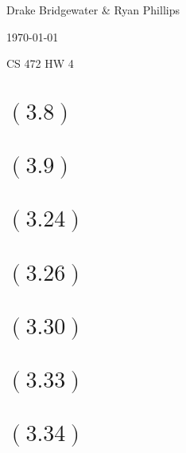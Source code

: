 \documentclass[letterpaper,12pt,titlepage]{article}
\def\name{Drake Bridgewater \& Ryan Phillips}
\begin{document}
\hfill \name

\hfill \today

\hfill CS 472 HW 4

\section*{$(3.8)$} 
\begin{mdframed}[style=MyFrame]
\end{mdframed}

\section*{$(3.9)$} 
\begin{mdframed}[style=MyFrame]
\end{mdframed}

\section*{$(3.24)$}
\begin{mdframed}[style=MyFrame]
\end{mdframed} 

\section*{$(3.26)$}
\begin{mdframed}[style=MyFrame]
\end{mdframed} 

\section*{$(3.30)$} 
\begin{mdframed}[style=MyFrame]
\end{mdframed}

\section*{$(3.33)$} 
\begin{mdframed}[style=MyFrame]
\end{mdframed}

\section*{$(3.34)$}
\begin{mdframed}[style=MyFrame]
\end{mdframed} 
\end{document}
